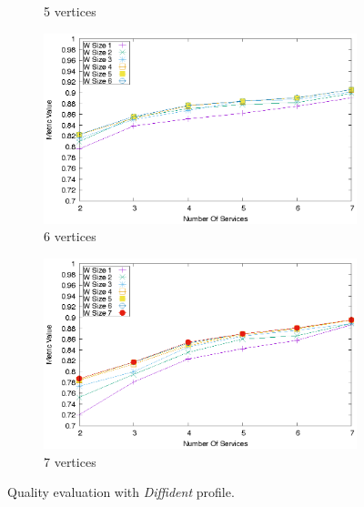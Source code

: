 \begin{figure}[ht]
\begin{subfigure}{0.33\textwidth}
    \caption{5 vertices}
    \label{fig:quality_window_bad_c}
  \end{subfigure}
  \hfill
  \begin{subfigure}{0.33\textwidth}
    \includegraphics[width=\textwidth]{Images/graphs/quality_plot_vbad_n6.eps}
    \caption{6 vertices}
    \label{fig:quality_window_bad_d}
  \end{subfigure}
  \hspace{0.04\textwidth}
  \begin{subfigure}{0.33\textwidth}
    \includegraphics[width=\textwidth]{Images/graphs/quality_plot_vbad_n7.eps}
    \caption{7 vertices}
    \label{fig:quality_window_bad_e}
  \end{subfigure}
  \hfill
  \caption{Quality evaluation with \textit{Diffident} profile.}
  \label{fig:quality_window_bad}
\end{figure}




